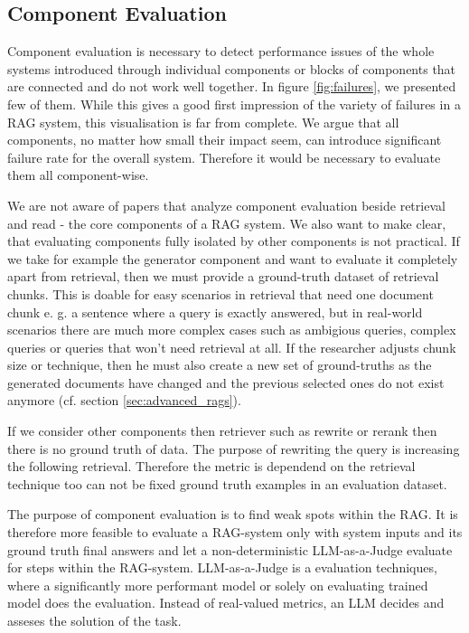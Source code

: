 \subsection{Component Evaluation}

Component evaluation is necessary to detect performance issues of the whole systems introduced through individual components or blocks of components that are connected and do not work well together.\cite{Salemi.2024} In figure \ref{fig:failures}, we presented few of them. While this gives a good first impression of the variety of failures in a RAG system, this visualisation is far from complete. We argue that all components, no matter how small their impact seem, can introduce significant failure rate for the overall system. Therefore it would be necessary to evaluate them all component-wise. 

We are not aware of papers that analyze component evaluation beside retrieval and read - the core components of a RAG system. We also want to make clear, that evaluating components fully isolated by other components is not practical. If we take for example the generator component and want to evaluate it completely apart from retrieval, then we must provide a ground-truth dataset of retrieval chunks. This is doable for easy scenarios in retrieval that need one document chunk e. g. a sentence where a query is exactly answered, but in real-world scenarios there are much more complex cases such as ambigious queries, complex queries or queries that won't need retrieval at all.\cite{Huang.2023} If the researcher adjusts chunk size or technique, then he must also create a new set of ground-truths as the generated documents have changed and the previous selected ones do not exist anymore (cf. section \ref{sec:advanced_rags}). 

If we consider other components then retriever such as rewrite or rerank then there is no ground truth of data. The purpose of rewriting the query is increasing the following retrieval. Therefore the metric is dependend on the retrieval technique too can not be fixed ground truth examples in an evaluation dataset.

The purpose of component evaluation is to find weak spots within the RAG. It is therefore more feasible to evaluate a RAG-system only with system inputs and its ground truth final answers and let a non-deterministic LLM-as-a-Judge evaluate for steps within the RAG-system. LLM-as-a-Judge is a evaluation techniques, where a significantly more performant model or solely on evaluating trained model does the evaluation. Instead of real-valued metrics, an LLM decides and asseses the solution of the task. 

